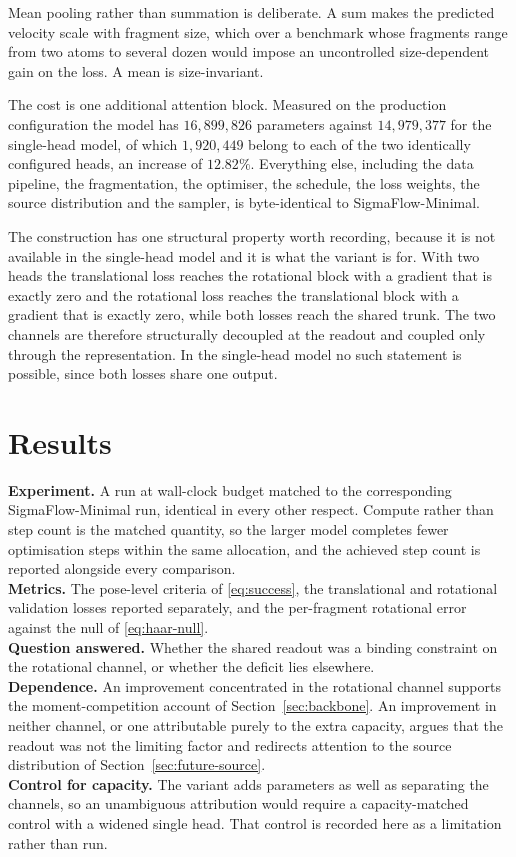 \documentclass[11pt,a4paper]{report}
\theoremstyle{plain}
\theoremstyle{definition}
\theoremstyle{remark}
\newenvironment{reserved}[1]{%
    \begin{tcolorbox}[
      enhanced, breakable,
      colback=PanelGrey, colframe=DraftBlue,
      boxrule=0.5pt, left=6pt,right=6pt,top=5pt,bottom=5pt,
      fonttitle=\bfseries\small\sffamily,
      title={RESERVED \textendash\ #1}]
      \small\sffamily
  }{%
    \end{tcolorbox}
  }
\newenvironment{reserved}[1]{\setbox0=\vbox\bgroup}{\egroup}
\begin{document}
Mean pooling rather than summation is deliberate. A sum makes the predicted
velocity scale with fragment size, which over a benchmark whose fragments range
from two atoms to several dozen would impose an uncontrolled size-dependent
gain on the loss. A mean is size-invariant.

The cost is one additional attention block. Measured on the production
configuration the model has $16{,}899{,}826$ parameters against
$14{,}979{,}377$ for the single-head model, of which $1{,}920{,}449$ belong to
each of the two identically configured heads, an increase of $12.82\%$.
Everything else, including the data pipeline, the fragmentation, the optimiser,
the schedule, the loss weights, the source distribution and the sampler, is
byte-identical to SigmaFlow-Minimal.

The construction has one structural property worth recording, because it is not
available in the single-head model and it is what the variant is for. With two
heads the translational loss reaches the rotational block with a gradient that
is exactly zero and the rotational loss reaches the translational block with a
gradient that is exactly zero, while both losses reach the shared trunk. The
two channels are therefore structurally decoupled at the readout and coupled
only through the representation. In the single-head model no such statement is
possible, since both losses share one output.

\section{Results}

\begin{reserved}{SigmaFlow-Separate against SigmaFlow-Minimal}
\textbf{Experiment.} A run at wall-clock budget matched to the corresponding
SigmaFlow-Minimal run, identical in every other respect. Compute rather than
step count is the matched quantity, so the larger model completes fewer
optimisation steps within the same allocation, and the achieved step count is
reported alongside every comparison.\\
\textbf{Metrics.} The pose-level criteria of \eqref{eq:success}, the
translational and rotational validation losses reported separately, and the
per-fragment rotational error against the null of \eqref{eq:haar-null}.\\
\textbf{Question answered.} Whether the shared readout was a binding constraint
on the rotational channel, or whether the deficit lies elsewhere.\\
\textbf{Dependence.} An improvement concentrated in the rotational channel
supports the moment-competition account of Section~\ref{sec:backbone}. An
improvement in neither channel, or one attributable purely to the extra
capacity, argues that the readout was not the limiting factor and redirects
attention to the source distribution of Section~\ref{sec:future-source}.\\
\textbf{Control for capacity.} The variant adds parameters as well as
separating the channels, so an unambiguous attribution would require a
capacity-matched control with a widened single head. That control is recorded
here as a limitation rather than run.
\end{reserved}
\end{document}
